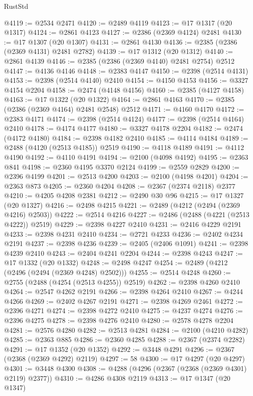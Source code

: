 \begin{lexlean}{RustStd}
\begin{coremodule}
@4119 := @2534 @2471
@4120 := @2489 @4119
@4123 := @17 @1317 (@20 @1317)
@4124 := @2861 @4123
@4127 := @2386 (@2369 @4124) @2481
@4130 := @17 @1307 (@20 @1307)
@4131 := @2861 @4130
@4136 := @2385 (@2386 (@2369 @4131) @2481 @2782)
@4139 := @17 @1312 (@20 @1312)
@4140 := @2861 @4139
@4146 := @2385 (@2386 (@2369 @4140) @2481 @2754) @2512
@4147 := @4136 @4146
@4148 := @2383 @4147
@4150 := @2398 (@2514 @4131)
@4153 := @2398 (@2514 @4140) @2410
@4154 := @4150 @4153
@4156 := @3327 @4154 @2204
@4158 := @2474 (@4148 @4156)
@4160 := @2385 (@4127 @4158)
@4163 := @17 @1322 (@20 @1322)
@4164 := @2861 @4163
@4170 := @2385 (@2386 (@2369 @4164) @2481 @2548) @2512
@4171 := @4160 @4170
@4172 := @2383 @4171
@4174 := @2398 (@2514 @4124)
@4177 := @2398 (@2514 @4164) @2410
@4178 := @4174 @4177
@4180 := @3327 @4178 @2204
@4182 := @2474 (@4172 @4180)
@4184 := @2398 @4182 @2410
@4185 := @4114 @4184
@4189 := @2488 (@4120 (@2513 @4185)) @2519
@4190 := @4118 @4189
@4191 := @4112 @4190
@4192 := @4110 @4191
@4194 := @2100 (@4098 @4192)
@4195 := @2363 @841
@4198 := @2360 @4195 @3370 @2124
@4199 := @2559 @2829
@4200 := @2396 @4199
@4201 := @2513 @4200
@4203 := @2100 (@4198 @4201)
@4204 := @2363 @873
@4205 := @2360 @4204
@4208 := @2367 (@2374 @2118) @2377
@4210 := @4205 @4208 @2381
@4212 := @2490 @30 @96
@4215 := @17 @1327 (@20 @1327)
@4216 := @2498 @4215
@4221 := @2489 (@4212 (@2494 (@2369 @4216) @2503))
@4222 := @2514 @4216
@4227 := @2486 (@2488 (@4221 (@2513 @4222)) @2519)
@4229 := @2398 @4227 @2410
@4231 := @2416 @4229 @2191
@4233 := @2398 @4231 @2410
@4234 := @2721 @4233
@4236 := @2402 @4234 @2191
@4237 := @2398 @4236
@4239 := @2405 (@2406 @1091)
@4241 := @2398 @4239 @2410
@4243 := @2404 @4241 @2204
@4244 := @2398 @4243
@4247 := @17 @1332 (@20 @1332)
@4248 := @2498 @4247
@4254 := @2489 (@4212 (@2496 (@2494 (@2369 @4248) @2502)))
@4255 := @2514 @4248
@4260 := @2755 (@2488 (@4254 (@2513 @4255)) @2519)
@4262 := @2398 @4260 @2410
@4264 := @2547 @4262 @2191
@4266 := @2398 @4264 @2410
@4267 := @4244 @4266
@4269 := @2402 @4267 @2191
@4271 := @2398 @4269 @2461
@4272 := @2396 @4271
@4274 := @2398 @4272 @2410
@4275 := @4237 @4274
@4276 := @2396 @4275
@4278 := @2398 @4276 @2410
@4280 := @2578 @4278 @2204
@4281 := @2576 @4280
@4282 := @2513 @4281
@4284 := @2100 (@4210 @4282)
@4285 := @2363 @885
@4286 := @2360 @4285
@4288 := @2367 (@2374 @2282)
@4291 := @17 @1352 (@20 @1352)
@4292 := @3448 @4291
@4296 := @2367 (@2368 (@2369 @4292) @2119)
@4297 := 58
@4300 := @17 @4297 (@20 @4297)
@4301 := @3448 @4300
@4308 := @4288 (@4296 (@2367 (@2368 (@2369 @4301) @2119) @2377))
@4310 := @4286 @4308 @2119
@4313 := @17 @1347 (@20 @1347)

\end{coremodule}
\end{lexlean}
